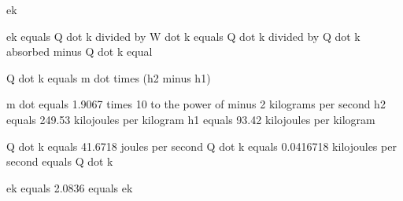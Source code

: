 ek  

ek equals Q dot k divided by W dot k equals Q dot k divided by Q dot k absorbed minus Q dot k equal  

Q dot k equals m dot times (h2 minus h1)  

m dot equals 1.9067 times 10 to the power of minus 2 kilograms per second  
h2 equals 249.53 kilojoules per kilogram  
h1 equals 93.42 kilojoules per kilogram  

Q dot k equals 41.6718 joules per second  
Q dot k equals 0.0416718 kilojoules per second equals Q dot k  

ek equals 2.0836 equals ek